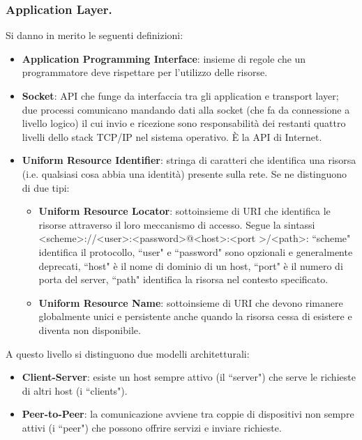\documentclass[11pt, italian, openany]{book}
\begin{document}
\begin{sloppypar}
\subsubsection{Application Layer.}
Si danno in merito le seguenti definizioni:
\begin{itemize}[topsep=0pt, itemsep=0pt, parsep=0pt]
	\item \textbf{Application Programming Interface}: insieme di regole che un programmatore deve rispettare per l'utilizzo delle risorse.
	\item \textbf{Socket}: API che funge da interfaccia tra gli application e transport layer; due processi comunicano mandando dati alla socket (che
	fa da connessione a livello logico) il cui invio e ricezione sono responsabilit\`a dei restanti quattro livelli dello stack TCP/IP nel sistema
	operativo. \`E la API di Internet.
	\item \textbf{Uniform Resource Identifier}: stringa di caratteri che identifica una risorsa (i.e. qualsiasi cosa abbia una identit\`a) presente
	sulla rete. Se ne distinguono di due tipi:
	\begin{itemize}[topsep=0pt, itemsep=0pt, parsep=0pt]
		\item \textbf{Uniform Resource Locator}: sottoinsieme di URI che identifica le risorse attraverso il loro meccanismo di accesso. Segue la sintassi
		\textless{scheme}\textgreater{://}\textless{user}\textgreater{:}\textless{password}\textgreater{@}\textless{host}\textgreater{:}\textless{port}
		\textgreater{/}\textless{path}\textgreater:
		``scheme" identifica il protocollo, ``user" e ``password" sono opzionali e generalmente deprecati, ``host" \`e il nome di dominio di un host,
		``port" \`e il numero di porta del server, ``path" identifica la risorsa nel contesto specificato.
		\item \textbf{Uniform Resource Name}: sottoinsieme di URI che devono rimanere globalmente unici e persistente anche quando la risorsa cessa di
		esistere e diventa non disponibile.
	\end{itemize}
\end{itemize}

A questo livello si distinguono due modelli architetturali:
\begin{itemize}[topsep=0pt, itemsep=0pt, parsep=0pt]
	\item \textbf{Client-Server}: esiste un host sempre attivo (il ``server") che serve le richieste di altri host (i ``clients").
	\item \textbf{Peer-to-Peer}: la comunicazione avviene tra coppie di dispositivi non sempre attivi (i ``peer") che possono offrire servizi e inviare
	richieste.
\end{itemize}


\end{sloppypar}
\end{document}
